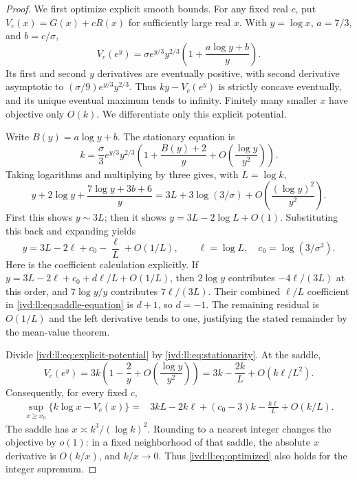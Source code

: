\documentclass[11pt,letterpaper]{article}
\theoremstyle{remark}\newtheorem{remark}[theorem]{Remark}
\numberwithin{equation}{section}
\begin{document}
\begin{proof}
We first optimize explicit smooth bounds. For any fixed real $c$,
put $V_c(x)=G(x)+cR(x)$ for sufficiently large real $x$. With
$y=\log x$, $a=7/3$, and $b=c/\sigma$,
\begin{equation}\label{ivd:ll:eq:explicit-potential}
 V_c(e^y)=\sigma e^{y/3}y^{2/3}
             \left(1+\frac{a\log y+b}{y}\right).
\end{equation}
Its first and second $y$ derivatives are eventually positive,
with second derivative asymptotic to
$(\sigma/9)e^{y/3}y^{2/3}$. Thus $ky-V_c(e^y)$ is strictly
concave eventually, and its unique eventual maximum tends to
infinity. Finitely many smaller $x$ have objective only $O(k)$.
We differentiate only this explicit potential.

Write $B(y)=a\log y+b$. The stationary equation is
\begin{equation}\label{ivd:ll:eq:stationarity}
 k=\frac\sigma3e^{y/3}y^{2/3}
       \left(1+\frac{B(y)+2}{y}
                    +O\!\left(\frac{\log y}{y^2}\right)\right).
\end{equation}
Taking logarithms and multiplying by three gives, with
$L=\log k$,
\begin{equation}\label{ivd:ll:eq:saddle-equation}
 y+2\log y+\frac{7\log y+3b+6}{y}
 =3L+3\log(3/\sigma)
                +O\!\left(\frac{(\log y)^2}{y^2}\right).
\end{equation}
First this shows $y\sim3L$; then it shows
$y=3L-2\log L+O(1)$. Substituting this back and expanding yields
\begin{equation}\label{ivd:ll:eq:saddle-location}
 y=3L-2\ell+c_0-\frac\ell L+O(1/L),\qquad
 \ell=\log L,\quad c_0=\log(3/\sigma^3).
\end{equation}
Here is the coefficient calculation explicitly. If
$y=3L-2\ell+c_0+d\ell/L+O(1/L)$, then $2\log y$ contributes
$-4\ell/(3L)$ at this order, and $7\log y/y$ contributes
$7\ell/(3L)$. Their combined $\ell/L$ coefficient in
\eqref{ivd:ll:eq:saddle-equation} is $d+1$, so $d=-1$.
The remaining residual is $O(1/L)$ and the left derivative tends
to one, justifying the stated remainder by the mean-value theorem.

Divide \eqref{ivd:ll:eq:explicit-potential} by
\eqref{ivd:ll:eq:stationarity}. At the saddle,
\begin{equation}\label{ivd:ll:eq:saddle-value-potential}
 V_c(e^y)=3k\left(1-\frac2y
                    +O\!\left(\frac{\log y}{y^2}\right)\right)
          =3k-\frac{2k}{L}+O(k\ell/L^2).
\end{equation}
Consequently, for every fixed $c$,
\begin{align}\label{ivd:ll:eq:optimized}
 \sup_{x\ge x_0}\{k\log x-V_c(x)\}
 ={}&3kL-2k\ell+(c_0-3)k-\frac{k\ell}{L}+O(k/L).
\end{align}
The saddle has
$x\asymp k^3/(\log k)^2$. Rounding to a nearest integer changes
the objective by $o(1)$: in a fixed neighborhood of that saddle,
the absolute $x$ derivative is $O(k/x)$, and $k/x\to0$.
Thus \eqref{ivd:ll:eq:optimized} also holds for the integer supremum.


\end{proof}
\end{document}
